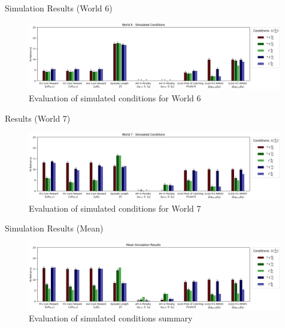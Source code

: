 \documentclass[aspectratio=1610, xcolor=dvipsnames]{packages/beamer}
\begin{document}
\begin{frame}{Simulation Results (World 6)}
     \begin{figure} \centering
        \includegraphics[width=0.99\textwidth]{../results/policy_comparisons/Fig_AssumptionComparison_W6}
        \caption{Evaluation of simulated conditions for World 6}
        \label{fig:PolicyCompW6}
    \end{figure}
\end{frame}

\begin{frame}{Results (World 7)}
     \begin{figure} \centering
        \includegraphics[width=0.99\textwidth]{../results/policy_comparisons/Fig_AssumptionComparison_W7}
        \caption{Evaluation of simulated conditions for World 7}
        \label{fig:PolicyCompW7}
    \end{figure}
\end{frame}

\begin{frame}{Simulation Results (Mean)}
     \begin{figure} \centering
        \includegraphics[width=0.99\textwidth]{../results/policy_comparisons/Fig_AssumptionComparison_Summary}
        \caption{Evaluation of simulated conditions summary}
        \label{fig:PolicyCompSummary}
    \end{figure}
\end{frame}
\end{document}
